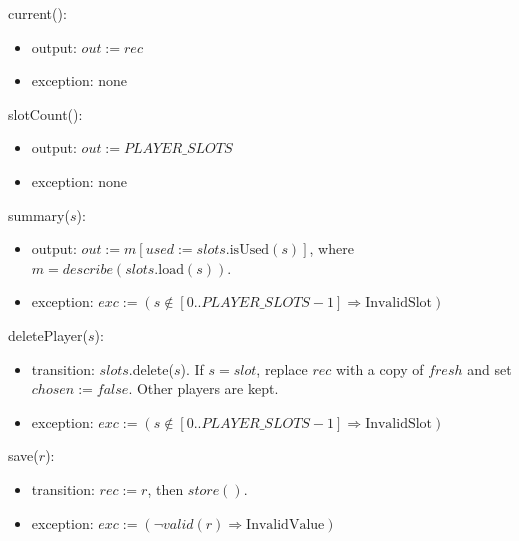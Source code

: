 \documentclass[10pt, titlepage]{article}
\newcommand{\T}[1]{\mathit{#1}}          %
\newcommand{\out}{\mathit{out}}
\newcommand{\exc}{\mathit{exc}}
\newcommand{\false}{\mathit{false}}
\begin{document}
\begin{samepage}
\noindent current():
\begin{itemize}
\item output: $\out := \T{rec}$
\item exception: none
\end{itemize}
\end{samepage}
\par\pagebreak[0]

\begin{samepage}
\noindent slotCount():
\begin{itemize}
\item output: $\out := \T{PLAYER\_SLOTS}$
\item exception: none
\end{itemize}
\end{samepage}
\par\pagebreak[0]

\begin{samepage}
\noindent summary($s$):
\begin{itemize}
\item output: $\out := m[\T{used} := \T{slots}.\text{isUsed}(s)]$, where
  $m = \T{describe}(\T{slots}.\text{load}(s))$.
\item exception: $\exc := (s \notin [0..\T{PLAYER\_SLOTS}-1]
  \Rightarrow \text{InvalidSlot})$
\end{itemize}
\end{samepage}
\par\pagebreak[0]

\begin{samepage}
\noindent deletePlayer($s$):
\begin{itemize}
\item transition: $\T{slots}$.delete($s$). If $s = \T{slot}$,
  replace $\T{rec}$ with a copy of $\T{fresh}$ and set
  $\T{chosen} := \false$. Other players are kept.
\item exception: $\exc := (s \notin [0..\T{PLAYER\_SLOTS}-1]
  \Rightarrow \text{InvalidSlot})$
\end{itemize}
\end{samepage}
\par\pagebreak[0]

\begin{samepage}
\noindent save($r$):
\begin{itemize}
\item transition: $\T{rec} := r$, then $\T{store}()$.
\item exception: $\exc := (\neg\T{valid}(r) \Rightarrow
  \text{InvalidValue})$
\end{itemize}
\end{samepage}
\par\pagebreak[0]
\end{document}

